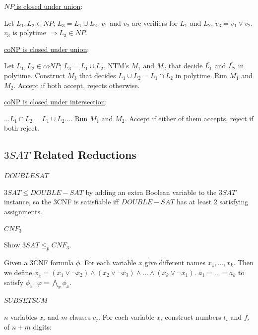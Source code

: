 \documentclass[10pt,landscape,a4paper]{article}
\begin{document}
\begin{multicols*}{3}
\underline{$NP$ is closed under union}:

Let $L_1, L_2 \in NP$; $L_3 = L_1 \cup L_2$. $v_1$ and $v_2$ are verifiers for $L_1$ and $L_2$. $v_3 = v_1 \vee v_2$. $v_3$ is polytime $\Rightarrow L_3 \in NP$.


\underline{coNP is closed under union}:

Let $L_1, L_2 \in coNP$; $L_3 = L_1 \cup L_2$. NTM's $M_1$ and $M_2$ that decide $\overline{L_1}$ and $\overline{L_2}$ in polytime. Construct $M_3$ that decides $\overline{L_1 \cup L_2} = \overline{L_1} \cap \overline{L_2}$ in polytime. Run $M_1$ and $M_2$. Accept if both accept, rejects otherwise.

\underline{coNP is closed under intersection}:

$\ldots \overline{L_1 \cap L_2} = \overline{L_1} \cup \overline{L_2} \ldots$. Run $M_1$ and $M_2$. Accept if either of them accepts, reject if both reject.






\subsection{$3SAT$ Related Reductions}

\underline{$DOUBLESAT$}

$3SAT \leq DOUBLE-SAT$ by adding an extra Boolean variable to the $3SAT$ instance, so the 3CNF is satisfiable iff $DOUBLE-SAT$ has at least 2 satisfying assignments.

\underline{$CNF_3$}

Show $3SAT \leq_p CNF_3$.

Given a 3CNF formula $\phi$. For each variable $x$ give different names $x_1, \ldots, x_k$. Then we define $\phi_x = (x_1 \vee \neg x_2) \wedge (x_2 \vee \neg x_3) \wedge \ldots \wedge (x_k \vee \neg x_1)$. $a_1 = \ldots = a_k$ to satisfy $\phi_x$. $\varphi = \bigwedge_x \phi_x$.

\underline{$SUBSETSUM$}

$n$ variables $x_i$ and $m$ clauses $c_j$. For each variable $x_i$ construct numbers $t_i$ and $f_i$ of $n + m$ digits:


\end{multicols*}
\end{document}
